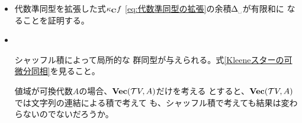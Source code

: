 \begin{todo}[このあと]
\begin{itemize}
\begin{equation}
{				& A \\
			}\end{equation}
			ここで、$\kappa_Af$は、$W$の基底系を$E_W$として、次のように与えられる
			ものとする。
			\begin{equation}\label{eq:代数準同型の拡張}\begin{split}
				\kappa_Af = \left(\sum_{e\in E_W}(fe)(i_We)^\dag\right)^*
				\quad\text{for all }f\in \mybf{Vec}(W,A)
			\end{split}\end{equation}
			この式の右辺を特徴づける性質を見つけることが課題となる。
			$\kappa_Af$は、
			\begin{itemize}\setlength{\itemsep}{-1mm} %
				\item ベクトル空間として$W\simeq V$が成り立ち、
				\item $\myop{span}i_WE_W=V$となるときに
			\end{itemize} %
			代数準同型となるようにする。代数準同型を拡張することになる。
			\item 代数準同型を拡張した式$\kappa_{\mathbf{C}} f$
			\eqref{eq:代数準同型の拡張}の余積$\Delta_\myspace$が有限和に
			なることを証明する。
			\item {} \\
			\begin{boxedminipage}{\linewidth} シャッフル積によって局所的な
			群同型が与えられる。式\eqref{Kleeneスターの可微分同相}を見ること。
			\end{boxedminipage}
			値域が可換代数$A$の場合、${\mathbf{Vec}}({{\mathcal{T}}} V,A)$だけを考える
			とすると、${\mathbf{Vec}}({{\mathcal{T}}} V,A)$では文字列の連結による積で考えて
			も、シャッフル積で考えても結果は変わらないのでないだろうか。
		\end{itemize} %
	\end{todo} %


